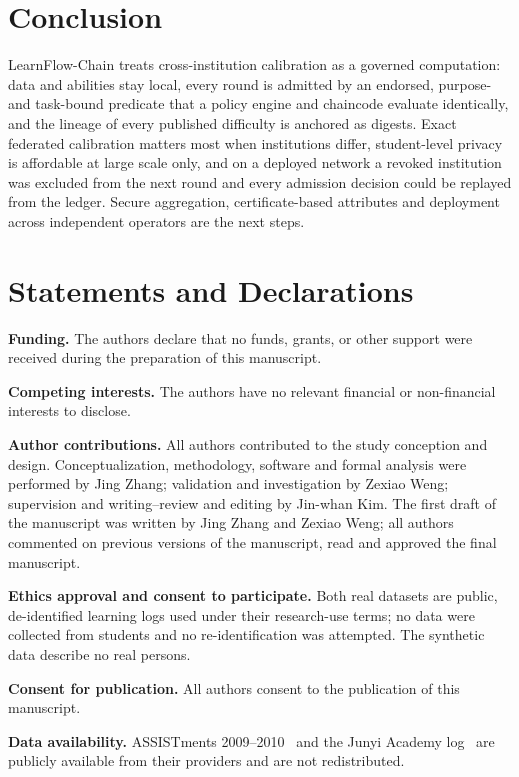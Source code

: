 \documentclass[pdflatex,iicol,sn-mathphys-num]{sn-jnl}
\theoremstyle{thmstyleone}
\begin{document}
\section{Conclusion}\label{sec:conclusion}

LearnFlow-Chain treats cross-institution calibration as a governed computation: data and abilities stay local, every round is admitted by an endorsed, purpose- and task-bound predicate that a policy engine and chaincode evaluate identically, and the lineage of every published difficulty is anchored as digests. Exact federated calibration matters most when institutions differ, student-level privacy is affordable at large scale only, and on a deployed network a revoked institution was excluded from the next round and every admission decision could be replayed from the ledger. Secure aggregation, certificate-based attributes and deployment across independent operators are the next steps.

\section*{Statements and Declarations}

\textbf{Funding.} The authors declare that no funds, grants, or other support were received during the
preparation of this manuscript.

\textbf{Competing interests.} The authors have no relevant financial or non-financial interests to
disclose.

\textbf{Author contributions.} All authors contributed to the study conception and design.
Conceptualization, methodology, software and formal analysis were performed by Jing Zhang;
validation and investigation by Zexiao Weng; supervision and writing--review and editing by
Jin-whan Kim. The first draft of the manuscript was written by Jing Zhang and Zexiao Weng; all
authors commented on previous versions of the manuscript, read and approved the final manuscript.

\textbf{Ethics approval and consent to participate.} Both real datasets are public, de-identified
learning logs used under their research-use terms; no data were collected from students and no
re-identification was attempted. The synthetic data describe no real persons.

\textbf{Consent for publication.} All authors consent to the publication of this manuscript.

\textbf{Data availability.} ASSISTments 2009--2010~\cite{feng2009addressing} and the Junyi Academy
log~\cite{junyi2020dataset} are publicly available from their providers and are not redistributed.
\end{document}
